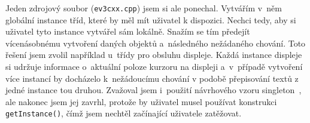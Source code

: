 Jeden zdrojový soubor (\texttt{ev3cxx.cpp}) jsem si ale ponechal. 
Vytvářím v~něm globální instance tříd, které by měl mít uživatel  k dispozici. 
% 
% 
Nechci tedy, aby si uživatel tyto instance vytvářel sám lokálně.
% 
% 
Snažím se tím předejít vícenásobnému vytvoření daných objektů a~následného nežádaného chování.
Toto řešení jsem zvolil například u~třídy pro obsluhu displeje. Každá instance displeje si udržuje informace o~aktuální poloze kurzoru na displeji a~v~případě vytvoření více instancí by docházelo k~nežádoucímu chování v podobě přepisování textů z jedné instance tou druhou.
Zvažoval jsem i~použití návrhového vzoru singleton~\cite{design-pattern-singleton}, ale nakonec jsem jej zavrhl, protože by uživatel musel používat konstrukci \texttt{getInstance()}, čímž jsem nechtěl začínající uživatele zatěžovat.

